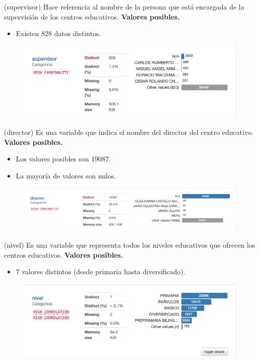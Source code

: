 \begin{variable}(supervisor) 
Hace referencia al nombre de la persona que está encargada de la supervisión de los centros educativos. 
\bigbreak 
\textbf{Valores posibles.}
\begin{itemize}
	\item Existen 828 datos distintos.  
\end{itemize}
\begin{figure}[H]
	\centering
	\includegraphics[scale=0.5]{Images/6}
\end{figure}
\end{variable}


\begin{variable}(director) 
Es una variable que indica el nombre del director del centro educativo. 
\bigbreak 
\textbf{Valores posibles.}
\begin{itemize}
	\item Los valores posibles son 19087.
	\item La mayoría de valores son nulos.
\end{itemize}
\begin{figure}[H]
	\centering
	\includegraphics[scale=0.5]{Images/7}
\end{figure}
\end{variable}


\begin{variable}(nivel) 
Es una variable que representa todos los niveles educativos que ofrecen los centros educativos.
\bigbreak 
\textbf{Valores posibles.}
\begin{itemize}
	\item 7 valores distintos (desde primaria hasta diversificado). 
\end{itemize}
\begin{figure}[H]
	\centering
	\includegraphics[scale=0.5]{Images/8}
\end{figure}
\end{variable}

